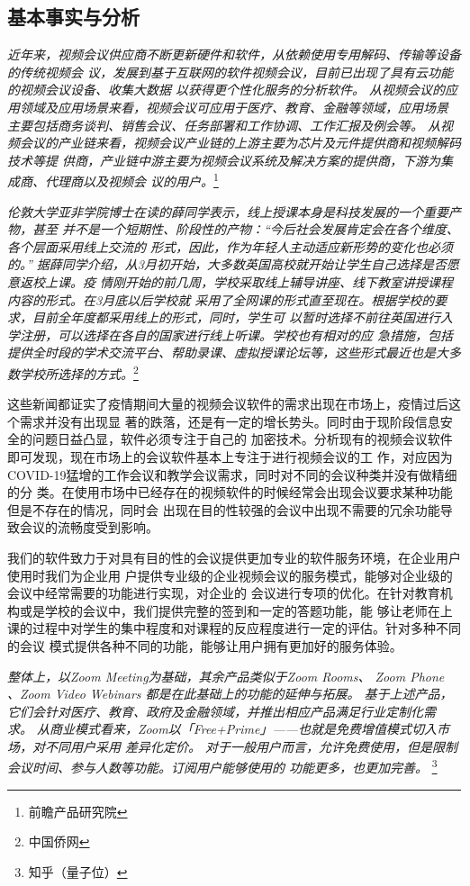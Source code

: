 \documentclass[a4paper,12pt]{article}
\begin{document}
\subsection{基本事实与分析}
\textit{近年来，视频会议供应商不断更新硬件和软件，从依赖使用专用解码、传输等设备的传统视频会
议，发展到基于互联网的软件视频会议，目前已出现了具有云功能的视频会议设备、收集大数据
以获得更个性化服务的分析软件。
从视频会议的应用领域及应用场景来看，视频会议可应用于医疗、教育、金融等领域，应用场景
主要包括商务谈判、销售会议、任务部署和工作协调、工作汇报及例会等。
从视频会议的产业链来看，视频会议产业链的上游主要为芯片及元件提供商和视频解码技术等提
供商，产业链中游主要为视频会议系统及解决方案的提供商，下游为集成商、代理商以及视频会
议的用户。}\footnote{前瞻产品研究院}

\textit{伦敦大学亚非学院博士在读的薛同学表示，线上授课本身是科技发展的一个重要产物，甚至
并不是一个短期性、阶段性的产物：“今后社会发展肯定会在各个维度、各个层面采用线上交流的
形式，因此，作为年轻人主动适应新形势的变化也必须的。”
据薛同学介绍，从3月初开始，大多数英国高校就开始让学生自己选择是否愿意返校上课。疫
情刚开始的前几周，学校采取线上辅导讲座、线下教室讲授课程内容的形式。在3月底以后学校就
采用了全网课的形式直至现在。根据学校的要求，目前全年度都采用线上的形式，同时，学生可
以暂时选择不前往英国进行入学注册，可以选择在各自的国家进行线上听课。学校也有相对的应
急措施，包括提供全时段的学术交流平台、帮助录课、虚拟授课论坛等，这些形式最近也是大多
数学校所选择的方式。}\footnote{中国侨网}

这些新闻都证实了疫情期间大量的视频会议软件的需求出现在市场上，疫情过后这个需求并没有出现显
著的跌落，还是有一定的增长势头。同时由于现阶段信息安全的问题日益凸显，软件必须专注于自己的
加密技术。分析现有的视频会议软件即可发现，现在市场上的会议软件基本上专注于进行视频会议的工
作，对应因为COVID-19猛增的工作会议和教学会议需求，同时对不同的会议种类并没有做精细的分
类。在使用市场中已经存在的视频软件的时候经常会出现会议要求某种功能但是不存在的情况，同时会
出现在目的性较强的会议中出现不需要的冗余功能导致会议的流畅度受到影响。

我们的软件致力于对具有目的性的会议提供更加专业的软件服务环境，在企业用户使用时我们为企业用
户提供专业级的企业视频会议的服务模式，能够对企业级的会议中经常需要的功能进行实现，对企业的
会议进行专项的优化。在针对教育机构或是学校的会议中，我们提供完整的签到和一定的答题功能，能
够让老师在上课的过程中对学生的集中程度和对课程的反应程度进行一定的评估。针对多种不同的会议
模式提供各种不同的功能，能够让用户拥有更加好的服务体验。

\textit{整体上，以Zoom Meeting为基础，其余产品类似于Zoom Rooms、 Zoom Phone 、Zoom
Video Webinars 都是在此基础上的功能的延伸与拓展。
基于上述产品，它们会针对医疗、教育、政府及金融领域，并推出相应产品满足行业定制化需
求。
从商业模式看来，Zoom以「Free+Prime」——也就是免费增值模式切入市场，对不同用户采用
差异化定价。
对于一般用户而言，允许免费使用，但是限制会议时间、参与人数等功能。订阅用户能够使用的
功能更多，也更加完善。}
\footnote{知乎（量子位）}
\end{document}
